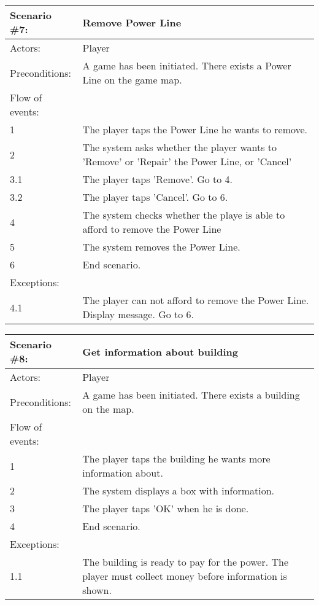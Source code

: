 \begin{tabular}{| l | p{10cm} |}
	\hline
	{\bf Scenario \#7:} & {\bf Remove Power Line} \\ \hline
	Actors: & Player \\ \hline
	Preconditions: & A game has been initiated. There exists a Power Line on the game map. \\ \hline
	Flow of events: & \\ \hline
	1 & The player taps the Power Line he wants to remove. \\ \hline
	2 & The system asks whether the player wants to 'Remove' or 'Repair' the Power Line, or 'Cancel' \\ \hline
	3.1 & The player taps 'Remove'. Go to 4. \\ \hline
	3.2 & The player taps 'Cancel'. Go to 6. \\ \hline
	4 & The system checks whether the playe is able to afford to remove the Power Line \\ \hline
	5 & The system removes the Power Line. \\ \hline
	6 & End scenario. \\ \hline
	Exceptions: & \\ \hline
	4.1 & The player can not afford to remove the Power Line. Display message. Go to 6. \\ \hline
\end{tabular}

\begin{tabular}{| l | p{10cm} |}
	\hline
	{\bf Scenario \#8:} & {\bf Get information about building} \\ \hline
	Actors: & Player \\ \hline
	Preconditions: & A game has been initiated. There exists a building on the map. \\ \hline
	Flow of events: & \\ \hline
	1 & The player taps the building he wants more information about. \\ \hline
	2 & The system displays a box with information. \\ \hline
	3 & The player taps 'OK' when he is done. \\ \hline
	4 & End scenario. \\ \hline
	Exceptions: & \\ \hline
	1.1 & The building is ready to pay for the power. The player must collect money before information is shown. \\ \hline
\end{tabular}

